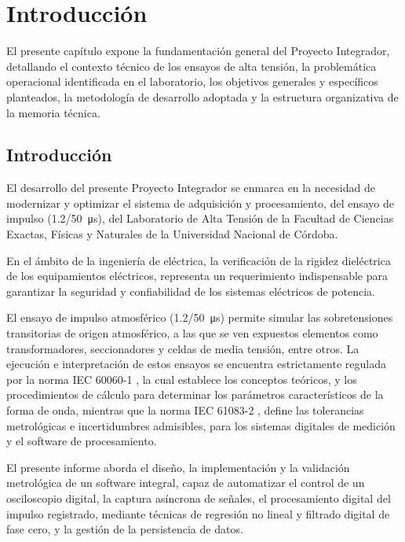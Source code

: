 \newpage
\chapter{Introducción}
\label{ch:introduccion}
\vspace{3\baselineskip}

El presente capítulo expone la fundamentación general del Proyecto Integrador, detallando el contexto técnico de los ensayos de alta tensión, la problemática operacional identificada en el laboratorio, los objetivos generales y específicos planteados, la metodología de desarrollo adoptada y la estructura organizativa de la memoria técnica.

\section{Introducción}
\label{sec:introduccion_gral}

El desarrollo del presente Proyecto Integrador se enmarca en la necesidad de modernizar y optimizar el sistema de adquisición y procesamiento, del ensayo de impulso (\qty[parse-numbers=false]{1.2/50}{\micro\second}), del Laboratorio de Alta Tensión de la Facultad de Ciencias Exactas, Físicas y Naturales de la Universidad Nacional de Córdoba.

En el ámbito de la ingeniería de eléctrica, la verificación de la rigidez dieléctrica de los equipamientos eléctricos, representa un requerimiento indispensable para garantizar la seguridad y confiabilidad de los sistemas eléctricos de potencia.

El ensayo de impulso atmosférico (\qty[parse-numbers=false]{1.2/50}{\micro\second}) permite simular las sobretensiones transitorias de origen atmosférico, a las que se ven expuestos elementos como transformadores, seccionadores y celdas de media tensión, entre otros. La ejecución e interpretación de estos ensayos se encuentra estrictamente regulada por la norma IEC 60060-1 \cite{iec60060_1}, la cual establece los conceptos teóricos, y los procedimientos de cálculo para determinar los parámetros característicos de la forma de onda, mientras que la norma IEC 61083-2 \cite{iec61083_2}, define las tolerancias metrológicas e incertidumbres admisibles, para los sistemas digitales de medición y el software de procesamiento.

El presente informe aborda el diseño, la implementación y la validación metrológica de un software integral, capaz de automatizar el control de un osciloscopio digital, la captura asíncrona de señales, el procesamiento digital del impulso registrado, mediante técnicas de regresión no lineal y filtrado digital de fase cero, y la gestión de la persistencia de datos.


